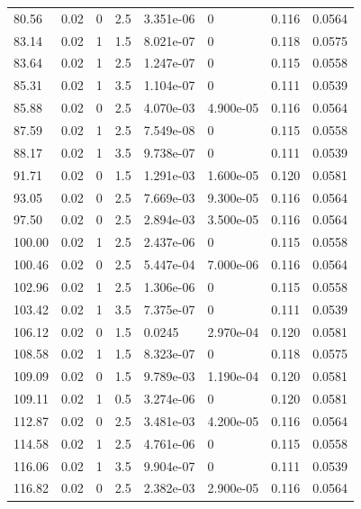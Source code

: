 \documentclass[preview]{standalone}
\begin{document}
{{{\begin{tabular}{L{1.2cm}C{1.2cm} C{0.3cm}C{0.5cm} C{1.4cm}C{1.4cm} C{1.4cm}C{1.4cm}}
  80.56  &  0.02  & 0     & 2.5 &  3.351e-06  & 0  & 0.116 &  0.0564   \\ 
  83.14  &  0.02  & 1     & 1.5 &  8.021e-07  & 0  & 0.118 &  0.0575   \\ 
  83.64  &  0.02  & 1     & 2.5 &  1.247e-07  & 0  & 0.115 &  0.0558   \\ 
  85.31  &  0.02  & 1     & 3.5 &  1.104e-07  & 0  & 0.111 &  0.0539   \\ 
  85.88  &  0.02  & 0     & 2.5 &  4.070e-03  & 4.900e-05  & 0.116 &  0.0564   \\ 
  87.59  &  0.02  & 1     & 2.5 &  7.549e-08  & 0  & 0.115 &  0.0558   \\ 
  88.17  &  0.02  & 1     & 3.5 &  9.738e-07  & 0  & 0.111 &  0.0539   \\ 
  91.71  &  0.02  & 0     & 1.5 &  1.291e-03  & 1.600e-05  & 0.120 &  0.0581   \\ 
  93.05  &  0.02  & 0     & 2.5 &  7.669e-03  & 9.300e-05  & 0.116 &  0.0564   \\ 
  97.50  &  0.02  & 0     & 2.5 &  2.894e-03  & 3.500e-05  & 0.116 &  0.0564   \\ 
  100.00  &  0.02  & 1     & 2.5 &  2.437e-06  & 0  & 0.115 &  0.0558   \\ 
  100.46  &  0.02  & 0     & 2.5 &  5.447e-04  & 7.000e-06  & 0.116 &  0.0564   \\ 
  102.96  &  0.02  & 1     & 2.5 &  1.306e-06  & 0  & 0.115 &  0.0558   \\ 
  103.42  &  0.02  & 1     & 3.5 &  7.375e-07  & 0  & 0.111 &  0.0539   \\ 
  106.12  &  0.02  & 0     & 1.5 &  0.0245  & 2.970e-04  & 0.120 &  0.0581   \\ 
  108.58  &  0.02  & 1     & 1.5 &  8.323e-07  & 0  & 0.118 &  0.0575   \\ 
  109.09  &  0.02  & 0     & 1.5 &  9.789e-03  & 1.190e-04  & 0.120 &  0.0581   \\ 
  109.11  &  0.02  & 1     & 0.5 &  3.274e-06  & 0  & 0.120 &  0.0581   \\ 
  112.87  &  0.02  & 0     & 2.5 &  3.481e-03  & 4.200e-05  & 0.116 &  0.0564   \\ 
  114.58  &  0.02  & 1     & 2.5 &  4.761e-06  & 0  & 0.115 &  0.0558   \\ 
  116.06  &  0.02  & 1     & 3.5 &  9.904e-07  & 0  & 0.111 &  0.0539   \\ 
  116.82  &  0.02  & 0     & 2.5 &  2.382e-03  & 2.900e-05  & 0.116 &  0.0564   \\ 

\end{tabular}}}}
\end{document}
